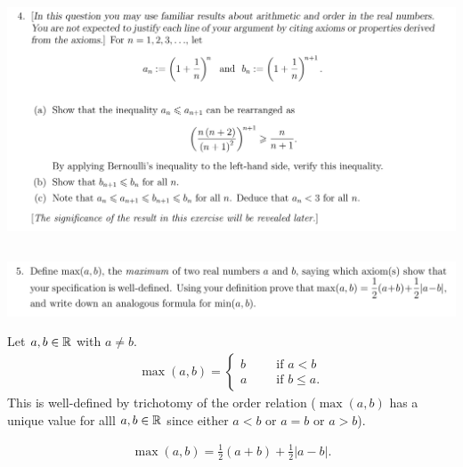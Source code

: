 \documentclass[12pt]{article}
\begin{document}
\subsection{}
\begin{mdframed}
\includegraphics[width=400pt]{img/oxford-prelims-M2-analysis-I-sheet-1-4.png}
\end{mdframed}

\newpage
\subsection{}
\begin{mdframed}
  \includegraphics[width=400pt]{img/oxford-M2-analysis-I-1-5.png}
\end{mdframed}

\begin{definition*}
  Let $a, b \in \mathbb{R}$ with $a \neq b$.
  \begin{align*}
    \max(a, b) =
    \begin{cases}
      b ~~~~~~~&\text{if $a < b$}\\
      a ~~~~~~~&\text{if $b \leq a$}.
    \end{cases}
  \end{align*}
  This is well-defined by trichotomy of the order relation ($\max(a, b)$ has a unique value for
  alll $a, b \in \mathbb{R}$ since either $a < b$ or $a = b$ or $a > b$).
\end{definition*}

\begin{theorem*}
  \begin{align*}
    \max(a, b) = \frac{1}{2}(a + b) + \frac{1}{2}|a - b|.
  \end{align*}
\end{theorem*}
\end{document}
